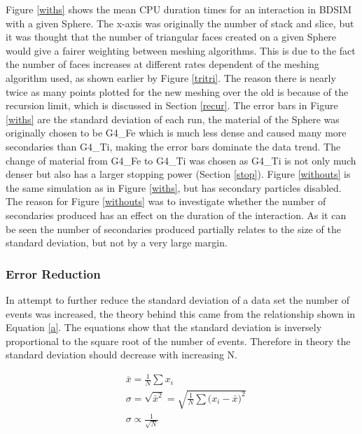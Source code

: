 \documentclass[12pt,a4paper]{article}
\begin{document}
\noindent Figure \ref{withs} shows the mean CPU duration times for an interaction in BDSIM with a given Sphere. The x-axis was originally the number of stack and slice, but it was thought that the number of triangular faces created on a given Sphere would give a fairer weighting between meshing algorithms. This is due to the fact the number of faces increases at different rates dependent of the meshing algorithm used, as shown earlier by Figure \ref{tritri}. The reason there is nearly twice as many points plotted for the new meshing over the old is because of the recursion limit, which is discussed in Section \ref{recur}. The error bars in Figure \ref{withs} are the standard deviation of each run, the material of the Sphere was originally chosen to be G4\_Fe which is much less dense and caused many more secondaries than G4\_Ti, making the error bars dominate the data trend. The change of material from G4\_Fe to G4\_Ti was chosen as G4\_Ti is not only much denser but also has a larger stopping power (Section \ref{stop}). Figure \ref{withouts} is the same simulation as in Figure \ref{withs}, but has secondary particles disabled. The reason for Figure \ref{withouts} was to investigate whether the number of secondaries produced has an effect on the duration of the interaction. As it can be seen the number of secondaries produced partially relates to the size of the standard deviation, but not by a very large margin.

\newpage
\subsubsection{Error Reduction}
\label{err}
\noindent In attempt to further reduce the standard deviation of a data set the number of events was increased, the theory behind this came from the relationship shown in Equation \ref{a}. The equations show that the standard deviation is inversely proportional to the square root of the number of events. Therefore in theory the standard deviation should decrease with increasing N.

\begin{equation}
\begin{aligned}
& \bar{x} = \frac{1}{N}\sum{x_i}\\
& \sigma = \sqrt{\bar{x}^2} = \sqrt{\frac{1}{N}\sum{(x_i - \bar{x}})^2}\\
& \sigma \propto \frac{1}{\sqrt{N}} 
\end{aligned}
\label{a}
\end{equation}
\end{document}
